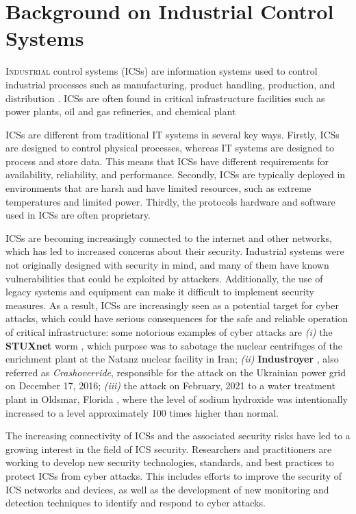 \chapter{Background on Industrial Control Systems}
\label{background}

\linenumbers
\lettrine[lines=2]{I}{ndustrial} control systems (ICSs) are information systems used to control industrial processes such as manufacturing, product handling, production, and distribution \cite{ics_definition}. ICSs are often found in critical infrastructure facilities such as power plants, oil and gas refineries, and chemical plant

\bigskip
ICSs are different from traditional IT systems in several key ways. Firstly, ICSs are designed to control physical processes, whereas IT systems are designed to process and store data. This means that ICSs have different requirements for availability, reliability, and performance. Secondly, ICSs are typically deployed in environments that are harsh and have limited resources, such as extreme temperatures and limited power. Thirdly, the protocols hardware and software used in ICSs are often proprietary. 

\bigskip
ICSs are becoming increasingly connected to the internet and other networks, which has led to increased concerns about their security. Industrial systems were not originally designed with security in mind, and many of them have known vulnerabilities that could be exploited by attackers. Additionally, the use of legacy systems and equipment can make it difficult to implement security measures. As a result, ICSs are increasingly seen as a potential target for cyber attacks, which could have serious consequences for the safe and reliable operation of critical infrastructure: some notorious examples of cyber attacks are \textit{(i)} the \textbf{STUXnet} worm \cite{stuxnet}, which purpose was to sabotage the nuclear centrifuges of the enrichment plant at the Natanz nuclear facility in Iran; \textit{(ii)} \textbf{Industroyer} \cite{industroyer}, also referred as \textit{Crashoverride}, responsible for the attack on the Ukrainian power grid on December 17, 2016; \textit{(iii)} the attack on February, 2021 to a water treatment plant in Oldsmar, Florida \cite{attacco_florida}, where the level of sodium hydroxide was intentionally increased to a level approximately 100 times higher than normal. 

\bigskip
The increasing connectivity of ICSs and the associated security risks have led to a growing interest in the field of ICS security. Researchers and practitioners are working to develop new security technologies, standards, and best practices to protect ICSs from cyber attacks. This includes efforts to improve the security of ICS networks and devices, as well as the development of new monitoring and detection techniques to identify and respond to cyber attacks.

